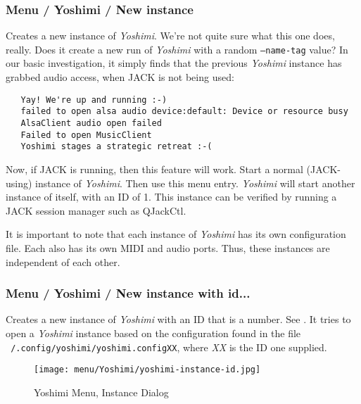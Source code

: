 \subsubsection{Menu / Yoshimi / New instance}
\label{subsubsec:menu_yoshimi_new_instance}

   Creates a new instance of \textsl{Yoshimi}.
   We're not quite sure what this one does, really.
   Does it create a new run of 
   \textsl{Yoshimi}
   with a random \texttt{--name-tag} value?
   In our basic investigation, it simply finds that the previous
   \textsl{Yoshimi}
   instance has grabbed audio access, when JACK is not being used:

\begin{verbatim}
   Yay! We're up and running :-)
   failed to open alsa audio device:default: Device or resource busy
   AlsaClient audio open failed
   Failed to open MusicClient
   Yoshimi stages a strategic retreat :-(
\end{verbatim}

   Now, if JACK is running, then this feature will work.
   Start a normal (JACK-using) instance of \textsl{Yoshimi}.
   Then use this menu entry.  \textsl{Yoshimi} will start another instance
   of itself, with an ID of 1.
   This instance can be verified by running a JACK session manager such as
   QJackCtl.

   It is important to note that each instance of \textsl{Yoshimi} has its
   own configuration file.  Each also has its own MIDI and audio ports.
   Thus, these instances are independent of each other.

\subsubsection{Menu / Yoshimi / New instance with id...}
\label{subsubsec:menu_yoshimi_new_instance_with_id}

   Creates a new instance of \textsl{Yoshimi}
   with an ID that is a number.
   See .
   It tries to open a \textsl{Yoshimi} instance based on the configuration
   found in the file
   \texttt{~/.config/\-yoshimi/\-yoshimi.configXX}, where
   \textsl{XX} is the ID one supplied.

\begin{figure}[H]
   \centering 
   \texttt{[image: menu/Yoshimi/yoshimi-instance-id.jpg]}
   \caption{Yoshimi Menu, Instance Dialog}
   \label{fig:yoshimi_instance_dialog}
\end{figure}

